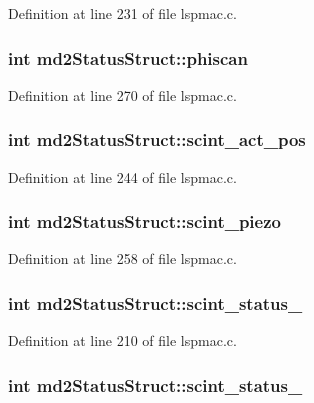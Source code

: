 Definition at line 231 of file lspmac.c.\hypertarget{structmd2StatusStruct_abe3d4a61a15f54590b061e23b45e659c}{
\subsubsection[{phiscan}]{\setlength{\rightskip}{0pt plus 5cm}int {\bf md2StatusStruct::phiscan}}}
\label{structmd2StatusStruct_abe3d4a61a15f54590b061e23b45e659c}


Definition at line 270 of file lspmac.c.\hypertarget{structmd2StatusStruct_a1c146fc792c4285eed5b2c446c214f98}{
\subsubsection[{scint\_\-act\_\-pos}]{\setlength{\rightskip}{0pt plus 5cm}int {\bf md2StatusStruct::scint\_\-act\_\-pos}}}
\label{structmd2StatusStruct_a1c146fc792c4285eed5b2c446c214f98}


Definition at line 244 of file lspmac.c.\hypertarget{structmd2StatusStruct_a031be48adfa016c637d6eae49054c435}{
\subsubsection[{scint\_\-piezo}]{\setlength{\rightskip}{0pt plus 5cm}int {\bf md2StatusStruct::scint\_\-piezo}}}
\label{structmd2StatusStruct_a031be48adfa016c637d6eae49054c435}


Definition at line 258 of file lspmac.c.\hypertarget{structmd2StatusStruct_a1723870357f428ac5c2758a2c9a475c7}{
\subsubsection[{scint\_\-status\_\-1}]{\setlength{\rightskip}{0pt plus 5cm}int {\bf md2StatusStruct::scint\_\-status\_}}}
\label{structmd2StatusStruct_a1723870357f428ac5c2758a2c9a475c7}


Definition at line 210 of file lspmac.c.\hypertarget{structmd2StatusStruct_a4e5bc72e2f4007370f1c29ea272c952f}{
\subsubsection[{scint\_\-status\_\-2}]{\setlength{\rightskip}{0pt plus 5cm}int {\bf md2StatusStruct::scint\_\-status\_}}}
\label{structmd2StatusStruct_a4e5bc72e2f4007370f1c29ea272c952f}


